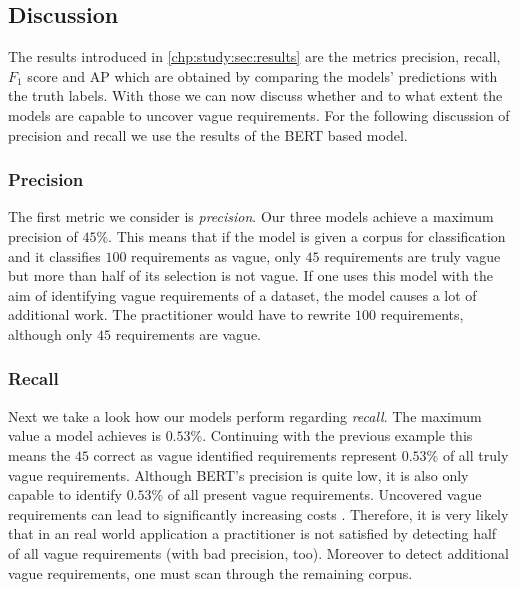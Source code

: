 \subsection{Discussion}
\label{chp:study:sec:interpretation:subsec:discussion}

The results introduced in \cref{chp:study:sec:results} are the metrics precision, recall, $F_1$ score and \ac{AP} which are obtained by comparing the models' predictions with the truth labels.
With those we can now discuss whether and to what extent the models are capable to uncover vague requirements.
For the following discussion of precision and recall we use the results of the \ac{BERT} based model.

\subsubsection{Precision}
\label{chp:study:sec:interpretation:subsec:discussion:precision}
The first metric we consider is \textit{precision}.
Our three models achieve a maximum precision of $45\%$.
This means that if the model is given a corpus for classification and it classifies $100$ requirements as vague, only $45$ requirements are truly vague but more than half of its selection is not vague.
If one uses this model with the aim of identifying vague requirements of a dataset, the model causes a lot of additional work.
The practitioner would have to rewrite $100$ requirements, although only $45$ requirements are vague.

\subsubsection{Recall}
\label{chp:study:sec:interpretation:subsec:discussion:recall}
Next we take a look how our models perform regarding \textit{recall}.
The maximum value a model achieves is $0.53\%$.
Continuing with the previous example this means the $45$ correct as vague identified requirements represent $0.53\%$ of all truly vague requirements.
Although \ac{BERT}'s precision is quite low, it is also only capable to identify $0.53\%$ of all present vague requirements.
Uncovered vague requirements can lead to significantly increasing costs \parencite{Femmer:2017}.
Therefore, it is very likely that in an real world application a practitioner is not satisfied by detecting half of all vague requirements (with bad precision, too).
Moreover to detect additional vague requirements, one must scan through the remaining corpus.

